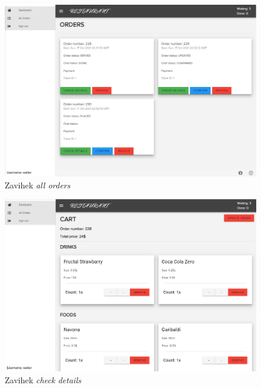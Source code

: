 \documentclass[a4paper, 12pt]{book}
\begin{document}
\begin{figure}[!htb]
\begin{center}
\includegraphics[width=13.5cm]{waiter_1.jpg}
\caption{Zavihek \textit{all orders}}
\label{Natakar_2}
\end{center}
\end{figure}
\begin{figure}[!htb]
\begin{center}
\includegraphics[width=12cm]{waiter_2.jpg}
\caption{Zavihek \textit{check details}}
\label{Natakar_3}
\end{center} 
\end{figure}
\end{document}
